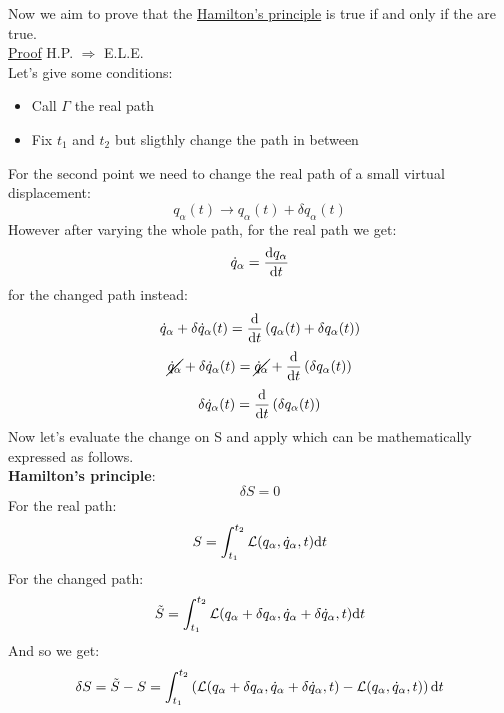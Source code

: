 Now we aim to prove that the \hyperref[q:Hamilton_principle_quote]{Hamilton's principle} is true if and only if the \eleref\;are true.\\
\underline{Proof} H.P. $\Rightarrow$ E.L.E.\\
Let's give some conditions:
\begin{itemize}
    \item Call $\Gamma$ the real path
    \item Fix $t_1$ and $t_2$ but sligthly change the path in between
\end{itemize}
For the second point we need to change the real path of a small virtual displacement:
\begin{equation}
    q_{\alpha}(t) \longrightarrow q_{\alpha}(t) + \delta q_{\alpha}(t)
\end{equation}
However after varying the whole path, for the real path we get:
\begin{equation}
    \dot{q}_{\alpha} = \dfrac{\mathrm{d}q_{\alpha}}{\mathrm{d}t}
\end{equation}
for the changed path instead:
\begin{equation}
    \dot{q}_{\alpha} + \delta \dot{q}_{\alpha}(t) = \dfrac{\mathrm{d} }{\mathrm{d}t}\left(q_{\alpha}(t) + \delta q_{\alpha}(t)\right)
\end{equation}
\begin{equation}
    \cancel{\dot{q}_{\alpha}} + \delta \dot{q}_{\alpha}(t) = \cancel{\dot{q}_{\alpha}} + \dfrac{\mathrm{d} }{\mathrm{d}t}\left(\delta q_{\alpha}(t)\right)
\end{equation}
\begin{equation}
    \delta \dot{q}_{\alpha}(t) = \dfrac{\mathrm{d} }{\mathrm{d}t}\left(\delta q_{\alpha}(t)\right)
\end{equation}
Now let's evaluate the change on S and apply \hpquoteref\;which can be mathematically expressed as follows.\\\textbf{Hamilton's principle}:
\begin{equation} \label{e:Hamilton_principle}
    \delta S = 0
\end{equation}
For the real path:
\begin{equation}
    S = \int_{t_1}^{t_2}\mathcal{L}(q_{\alpha},\dot{q}_{\alpha},t) \mathrm{d}t
\end{equation}
For the changed path:
\begin{equation}
    \tilde{S} = \int_{t_1}^{t_2}\mathcal{L}(q_{\alpha}+\delta q_{\alpha},\dot{q}_{\alpha} + \delta \dot{q}_{\alpha},t) \mathrm{d}t
\end{equation}
And so we get:
\begin{equation}
    \delta S = \tilde{S} - S = \int_{t_1}^{t_2}\left(\mathcal{L}(q_{\alpha}+\delta q_{\alpha},\dot{q}_{\alpha} + \delta \dot{q}_{\alpha},t) - \mathcal{L}(q_{\alpha},\dot{q}_{\alpha},t)\right) \mathrm{d}t
\end{equation}
